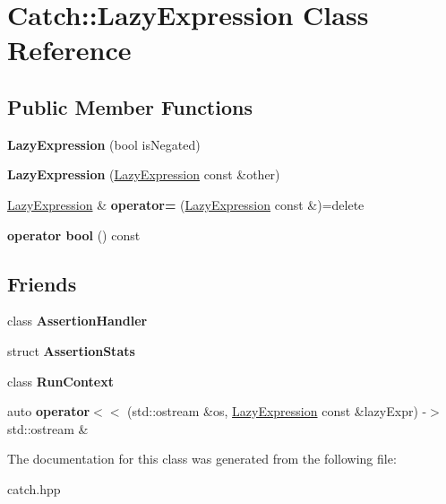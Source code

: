 \hypertarget{class_catch_1_1_lazy_expression}{}\section{Catch\+:\+:Lazy\+Expression Class Reference}
\label{class_catch_1_1_lazy_expression}
\subsection*{Public Member Functions}
\begin{DoxyCompactItemize}
\item 
\mbox{\label{class_catch_1_1_lazy_expression_a47186c2487bd4bf871e870ba8048553a}} 
{\bfseries Lazy\+Expression} (bool is\+Negated)
\item 
\mbox{\label{class_catch_1_1_lazy_expression_ab82d5e94df0e159b018fbde0170e46f8}} 
{\bfseries Lazy\+Expression} (\mbox{\hyperlink{class_catch_1_1_lazy_expression}{Lazy\+Expression}} const \&other)
\item 
\mbox{\label{class_catch_1_1_lazy_expression_ae4ae00d4f36f084c369f2da36565a822}} 
\mbox{\hyperlink{class_catch_1_1_lazy_expression}{Lazy\+Expression}} \& {\bfseries operator=} (\mbox{\hyperlink{class_catch_1_1_lazy_expression}{Lazy\+Expression}} const \&)=delete
\item 
\mbox{\label{class_catch_1_1_lazy_expression_acdb846cb230cecfc6aca7a925b31fbca}} 
{\bfseries operator bool} () const
\end{DoxyCompactItemize}
\subsection*{Friends}
\begin{DoxyCompactItemize}
\item 
\mbox{\label{class_catch_1_1_lazy_expression_a4301a3aa57b612dd8b6ef8461742ecab}} 
class {\bfseries Assertion\+Handler}
\item 
\mbox{\label{class_catch_1_1_lazy_expression_a64019eb137f5ce447cdc71cb80b6e7a4}} 
struct {\bfseries Assertion\+Stats}
\item 
\mbox{\label{class_catch_1_1_lazy_expression_af3aa096bb29a772bc534830f29a2ce7a}} 
class {\bfseries Run\+Context}
\item 
\mbox{\label{class_catch_1_1_lazy_expression_aa01086581cab2fcd2d4580b8fa787dfc}} 
auto {\bfseries operator$<$$<$} (std\+::ostream \&os, \mbox{\hyperlink{class_catch_1_1_lazy_expression}{Lazy\+Expression}} const \&lazy\+Expr) -\/$>$ std\+::ostream \&
\end{DoxyCompactItemize}


The documentation for this class was generated from the following file\+:\begin{DoxyCompactItemize}
\item 
catch.\+hpp\end{DoxyCompactItemize}
